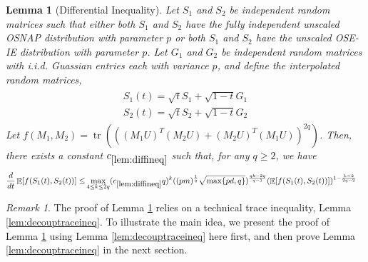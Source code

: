 \documentclass[11pt]{amsart}
\numberwithin{equation}{section}
\numberwithin{equation}{section}
\DeclareMathOperator{\E}{\mathbb{E}}
\DeclareMathOperator*{\tr}{tr}
\newtheorem{lemma}[theorem]{Lemma}
\theoremstyle{remark}
\newtheorem{remark}[theorem]{Remark}
\theoremstyle{definition}
\begin{document}
\begin{lemma}[Differential Inequality]\label{lem:diffineq}
 Let $S_1$ and $S_2$ be independent random matrices such that either both $S_1$ and $S_2$ have the fully independent unscaled OSNAP distribution with parameter $p$ or both $S_1$ and $S_2$ have the unscaled OSE-IE distribution with parameter $p$. Let $G_1$ and $G_2$ be independent random matrices with i.i.d. Guassian entries each with variance $p$, and define the interpolated random matrices,
\begin{align}
\begin{split} 
    S_1(t) = \sqrt{t}S_1 + \sqrt{1-t}G_1 \\
    S_2(t) = \sqrt{t}S_2 + \sqrt{1-t}G_2
\end{split}
\end{align}
Let $f(M_1,M_2)=\tr(((M_1U)^T(M_2U)+(M_2U)^T(M_1U))^{2q})$.
Then, there exists a constant $c_{\ref*{lem:diffineq}}$ such that, for any $q \ge 2$, we have
\begin{align*}
\frac{d}{dt} \E[f(S_1(t),S_2(t))] \le& \max \limits_{4 \le k \le 2q} (c_{\ref*{lem:diffineq}}q)^k ((pm)^{\frac{1}{q}}\sqrt{\max\{pd,q\}})^{\frac{qk-2q}{q-1}}(\E[f(S_1(t),S_2(t))])^{1-\frac{k-2}{2q-2}}
\end{align*}
\end{lemma}
\begin{remark}
The proof of Lemma \ref{lem:diffineq} relies on a technical trace inequality, Lemma \ref{lem:decouptraceineq}. To illustrate the main idea, we present the proof of Lemma \ref{lem:diffineq} using Lemma \ref{lem:decouptraceineq} here first, and then prove Lemma \ref{lem:decouptraceineq} in the next section.
\end{remark}
\end{document}
